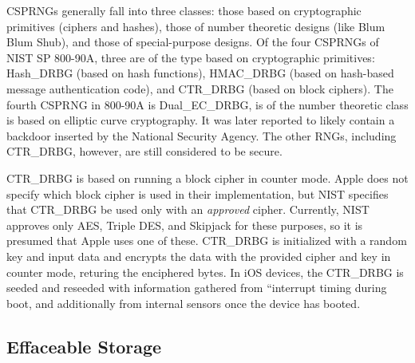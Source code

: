 CSPRNGs generally fall into three classes: those based on cryptographic
primitives (ciphers and hashes), those of number theoretic designs (like Blum
Blum Shub), and those of special-purpose designs. Of the four CSPRNGs of NIST
SP 800-90A, three are of the type based on cryptographic primitives: Hash\_DRBG
(based on hash functions), HMAC\_DRBG (based on hash-based message
authentication code), and CTR\_DRBG (based on block ciphers). The fourth CSPRNG
in 800-90A is Dual\_EC\_DRBG, is of the number theoretic class is based on
elliptic curve cryptography. It was later reported to likely contain a backdoor
inserted by the National Security Agency\cite{goodin}. The other RNGs,
including CTR\_DRBG, however, are still considered to be secure.

CTR\_DRBG is based on running a block cipher in counter
mode\cite{nistsp80090a}. Apple does not specify which block cipher is used in
their implementation, but NIST specifies that CTR\_DRBG be used only with an
\textit{approved} cipher. Currently, NIST approves only AES, Triple DES, and
Skipjack for these purposes\cite{nistblockciphers}, so it is presumed that
Apple uses one of these. CTR\_DRBG is initialized with a random key and input
data and encrypts the data with the provided cipher and key in counter mode,
returing the enciphered bytes. In iOS devices, the CTR\_DRBG is seeded and
reseeded with information gathered from ``interrupt timing during boot, and
additionally from internal sensors once the device has booted\cite{apple}.

\subsection{Effaceable Storage}
